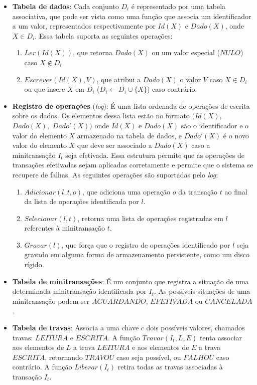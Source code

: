 \documentclass[11pt,twoside,a4paper]{book}
\begin{document}
\begin{itemize}

    \item \textbf{Tabela de dados}: Cada conjunto \(D_i\) é representado por uma tabela associativa, que pode ser vista como uma função que associa um identificador a um valor, representados respectivamente por \(Id(X)\) e \(Dado(X)\), onde \(X \in D_i\). Essa tabela suporta as seguintes operações:

    \begin{enumerate}
        \item $Ler(Id(X))$, que retorna $Dado(X)$ ou um valor especial ($NULO$) caso $X \notin D_i$

        \item $Escrever(Id(X), V)$, que atribui a $Dado(X)$ o valor $V$ caso $X \in D_i$ ou que insere $X$ em $D_i$ ($D_i \gets D_i \cup \{X\}$) caso contrário. 
    \end{enumerate}
 
    \item \textbf{Registro de operações} (\emph{log}): É uma lista ordenada de operações de escrita sobre os dados. Os elementos dessa lista estão no formato $(Id(X),$ $Dado(X),$ $Dado'(X))$ onde $Id(X)$ e $Dado(X)$ são o identificador e o valor do elemento $X$ armazenado na tabela de dados, e $Dado'(X)$ é o novo valor do elemento $X$ que deve ser associado a $Dado(X)$ caso a minitransação $I_t$ seja efetivada. Essa estrutura permite que as operações de transações efetivadas sejam aplicadas corretamente e permite que o sistema se recupere de falhas. As seguintes operações são suportadas pelo \emph{log}:

        \begin{enumerate}
            \item $Adicionar(l, t, o)$, que adiciona uma operação $o$ da transação $t$ ao final da lista de operações identificada por $l$.

            \item $Selecionar(l, t)$, retorna uma lista de operações registradas em $l$ referentes à minitransação $t$.

            \item $Gravar(l)$, que força que o registro de operações identificado por $l$ seja gravado em alguma forma de armazenamento persistente, como um disco rígido.
        \end{enumerate}

    \item \textbf{Tabela de minitransações}: É um conjunto que registra a situação de uma determinada minitransação identificada por $I_t$. As possíveis situações de uma minitransação podem ser $AGUARDANDO$, $EFETIVADA$ ou $CANCELADA$.

    \item \textbf{Tabela de travas}: Associa a uma chave $c$ dois possíveis valores, chamados travas: $LEITURA$ e $ESCRITA$. A função $Travar(I_t, L, E)$ tenta associar aos elementos de $L$ a trava $LEITURA$ e aos elementos de $E$ a trava $ESCRITA$, retornando $TRAVOU$ caso seja possível, ou $FALHOU$ caso contrário. A função $Liberar(I_t)$ retira todas as travas associadas à transação $I_t$.
\end{itemize}
\end{document}
